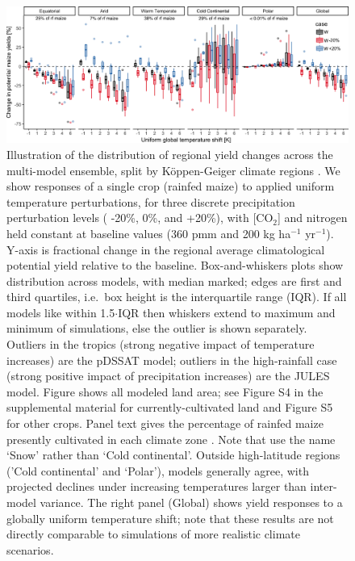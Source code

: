 \documentclass[gmd, manuscript]{copernicus} %
\begin{document}
{\begin{figure}[ht]
\centering
   \includegraphics[width=15cm]{figures/global_sim_CG.png}
   \caption{Illustration of the distribution of regional yield changes across the multi-model ensemble, split by K\"{o}ppen-Geiger climate regions \citep{rubel2010}. 
   We show responses of a single crop (rainfed maize) to applied uniform temperature perturbations, for three discrete precipitation perturbation levels ( -20\%, 0\%, and +20\%), with [CO$_2$] and nitrogen held constant at baseline values (360 pmm and 200 kg ha$^{-1}$ yr$^{-1}$). 
	Y-axis is fractional change in the regional average climatological potential yield relative to the baseline. Box-and-whiskers plots show distribution across models, with median marked; edges are first and third quartiles, i.e.\ box height is the interquartile range (IQR). 
	If all models like within 1.5$\cdot$IQR then whiskers extend to maximum and minimum of simulations, else the outlier is shown separately. Outliers in the tropics (strong negative impact of temperature increases) are the pDSSAT model; outliers in the high-rainfall case (strong positive impact of precipitation increases) are the JULES model. 
	Figure shows all modeled land area; see Figure S4 in the supplemental material for currently-cultivated land and Figure S5 for other crops. Panel text gives the percentage of rainfed maize presently cultivated in each climate zone \citep[data from][]{Portmann2010}. 
	Note that \citet{rubel2010} use the name `Snow' rather than `Cold continental'. 
	Outside high-latitude regions ('Cold continental' and `Polar'), models generally agree, with projected declines under increasing temperatures larger than inter-model variance. 
	The right panel (Global) shows yield responses to a globally uniform temperature shift; note that these results are not directly comparable to simulations of more realistic climate scenarios.}
   \label{fig:globesim}
\end{figure}

}
\end{document}
